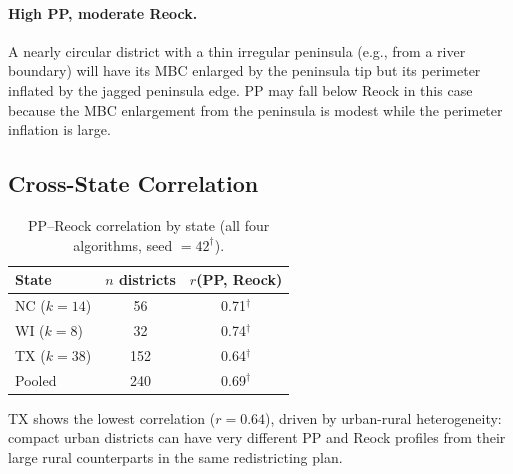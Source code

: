 \paragraph{High PP, moderate Reock.}
A nearly circular district with a thin irregular peninsula (e.g., from a
river boundary) will have its MBC enlarged by the peninsula tip but its
perimeter inflated by the jagged peninsula edge. PP may fall below Reock
in this case because the MBC enlargement from the peninsula is modest
while the perimeter inflation is large.

\subsection{Cross-State Correlation}

\begin{table}[ht]
\centering
\caption{PP--Reock correlation by state (all four algorithms, seed $= 42^\dagger$).}
\label{tab:pp_reock_state}
\begin{tabular}{lcc}
\toprule
State & $n$ districts & $r$(PP, Reock) \\
\midrule
NC ($k=14$) & 56 & 0.71$^\dagger$ \\
WI ($k=8$)  & 32 & 0.74$^\dagger$ \\
TX ($k=38$) & 152 & 0.64$^\dagger$ \\
Pooled      & 240 & 0.69$^\dagger$ \\
\bottomrule
\end{tabular}
\end{table}

TX shows the lowest correlation ($r = 0.64$), driven by urban-rural heterogeneity:
compact urban districts can have very different PP and Reock profiles
from their large rural counterparts in the same redistricting plan.
